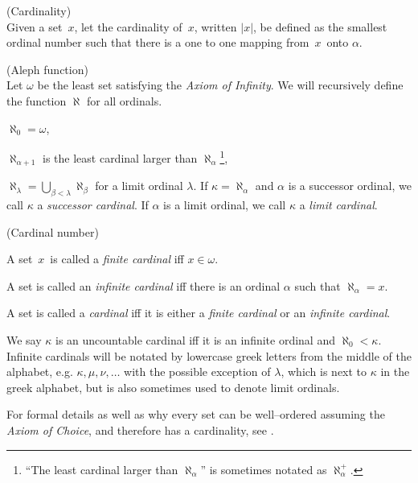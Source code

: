 \begin{definition}{(Cardinality)}\\
Given a set~$x$, let the cardinality of~$x$, written $|x|$, be defined as the smallest ordinal number such that there is a one to one mapping from~$x$~onto $\alpha$.
\end{definition}

\begin{definition}{(Aleph function)}\label{def:aleph}\\
Let $\omega$ be the least set satisfying the \emph{Axiom of Infinity}.
We will recursively define the function $\aleph$ for all ordinals.
\bce[(i)]
\item $\aleph_0 = \omega$,
\item $\aleph_{\alpha+1}$ is the least cardinal larger than $\aleph_\alpha$\footnote{``The least cardinal larger than $\aleph_\alpha$'' is sometimes notated as $\aleph_\alpha^{+}$.},
\item $\aleph_\lambda = \bigcup_{\beta < \lambda}\aleph_\beta$ for a limit ordinal $\lambda$.
\ece
If $\kappa = \aleph_\alpha$ and $\alpha$ is a successor ordinal, we call $\kappa$ a \emph{successor cardinal}. If $\alpha$ is a limit ordinal, we call $\kappa$ a \emph{limit cardinal}.
\end{definition} %

\begin{definition}{(Cardinal number)}\label{def:cardinal}\\
\bce[(i)]
\item A set~$x$~is called a \emph{finite cardinal} iff $x \in \omega$.
\item A set is called an \emph{infinite cardinal} iff there is an ordinal $\alpha$ such that $\aleph_\alpha = x$.
\item A set is called a \emph{cardinal} iff it is either a \emph{finite cardinal} or an \emph{infinite cardinal}.
\ece
\end{definition}
We say $\kappa$ is an uncountable cardinal iff it is an infinite ordinal and $\aleph_0 < \kappa$.
Infinite cardinals will be notated by lowercase greek letters from the middle of the alphabet, e.g. $\kappa, \mu, \nu, \ldots$ with the possible exception of $\lambda$, which is next to $\kappa$ in the greek alphabet, but is also sometimes used to denote limit ordinals.

For formal details as well as why every set can be well–ordered assuming the \emph{Axiom of Choice}, and therefore has a cardinality, see \cite{JechBook}. %

